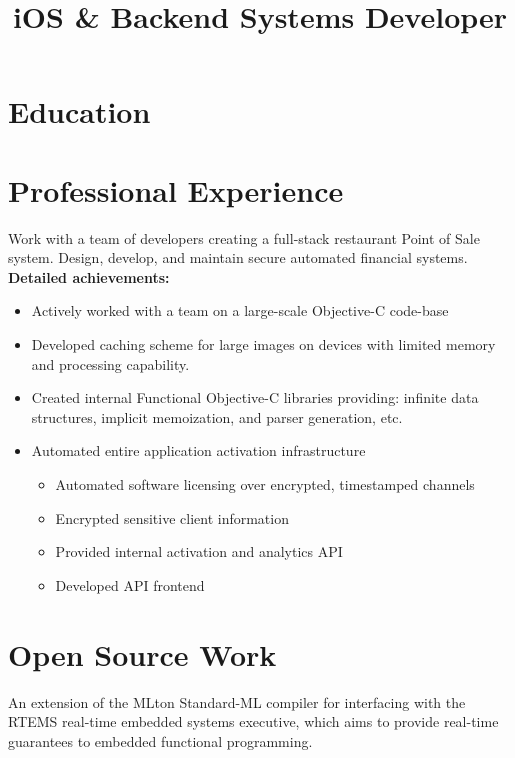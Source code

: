 \documentclass[11pt,a4paper,sans]{moderncv}   %
\title{iOS \& Backend Systems Developer}                          %
\begin{document}
\makecvtitle

\section{Education}

\section{Professional Experience}
{Work with a team of developers creating a full-stack restaurant Point of Sale system. Design, develop, and maintain secure automated financial systems.
\newline
\textbf{Detailed achievements:}
\begin{itemize}%
\item Actively worked with a team on a large-scale Objective-C code-base
\item Developed caching scheme for large images on devices with limited memory and processing capability.
\item Created internal Functional Objective-C libraries providing: infinite data structures, implicit memoization, and parser generation, etc.
\item Automated entire application activation infrastructure
  \begin{itemize}%
  \item Automated software licensing over encrypted, timestamped channels
  \item Encrypted sensitive client information
  \item Provided internal activation and analytics API
  \item Developed API frontend
  \end{itemize}
\end{itemize}}

\section{Open Source Work}
{
An extension of the MLton Standard-ML compiler for interfacing with the RTEMS real-time embedded systems executive, which aims to provide real-time guarantees to embedded functional programming.
}
\end{document}
